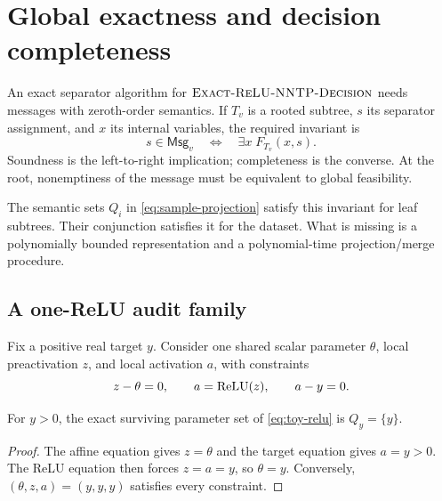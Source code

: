 \section{Global exactness and decision completeness}
\label{sec:global-exactness}

An exact separator algorithm for \(\textnormal{\textsc{Exact-ReLU-NNTP-Decision}}\) needs messages with
zeroth-order semantics.  If \(T_v\) is a rooted subtree, \(s\) its separator
assignment, and \(x\) its internal variables, the required invariant is
\begin{equation}
  s\in\mathsf{Msg}_v
  \quad\Longleftrightarrow\quad
  \exists x\;F_{T_v}(x,s).
  \label{eq:desired-semantic-invariant}
\end{equation}
Soundness is the left-to-right implication; completeness is the converse.  At
the root, nonemptiness of the message must be equivalent to global feasibility.

The semantic sets \(Q_i\) in \cref{eq:sample-projection} satisfy this invariant
for leaf subtrees.  Their conjunction satisfies it for the dataset.  What is
missing is a polynomially bounded representation and a polynomial-time
projection/merge procedure.

\subsection{A one-ReLU audit family}

Fix a positive real target \(y\).  Consider one shared scalar parameter
\(\theta\), local preactivation \(z\), and local activation \(a\), with
constraints
\begin{equation}
  z-\theta=0,\qquad a=\operatorname{ReLU}(z),\qquad a-y=0.
  \label{eq:toy-relu}
\end{equation}

\begin{lemma}
\label{lem:toy-projection}
For \(y>0\), the exact surviving parameter set of
\cref{eq:toy-relu} is \(Q_y=\{y\}\).
\end{lemma}

\begin{proof}
The affine equation gives \(z=\theta\) and the target equation gives \(a=y>0\).
The ReLU equation then forces \(z=a=y\), so \(\theta=y\).  Conversely,
\((\theta,z,a)=(y,y,y)\) satisfies every constraint.
\end{proof}

